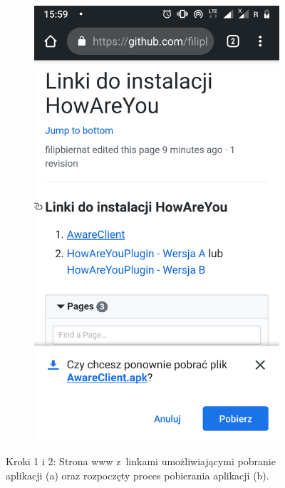 \begin{enumerate}
\begin{figure}[H]
\begin{subfigure}{0.35\textwidth}
			\includegraphics[scale=0.13]{dodatekA/2_2.png}
			\subcaption{\label{subfigure_b}}
		\end{subfigure}
		\caption{ Kroki 1 i 2: Strona www z~linkami umożliwiającymi pobranie aplikacji (a) oraz rozpoczęty proces pobierania aplikacji (b).}
	\end{figure}
	

\end{enumerate}
